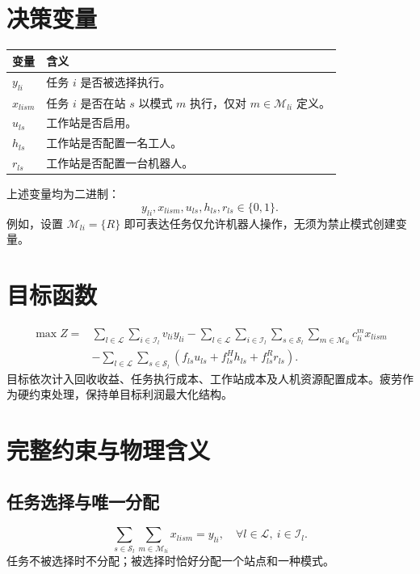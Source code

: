 \documentclass[UTF8,a4paper,11pt]{ctexart}
\begin{document}
\section{决策变量}
\begin{center}
\begin{tabularx}{\textwidth}{lX}
\toprule 变量 & 含义\\\midrule
$y_{li}$ & 任务 $i$ 是否被选择执行。\\
$x_{lism}$ & 任务 $i$ 是否在站 $s$ 以模式 $m$ 执行，仅对 $m\in\mathcal M_{li}$ 定义。\\
$u_{ls}$ & 工作站是否启用。\\
$h_{ls}$ & 工作站是否配置一名工人。\\
$r_{ls}$ & 工作站是否配置一台机器人。\\\bottomrule
\end{tabularx}
\end{center}
上述变量均为二进制：
\begin{equation}
y_{li},x_{lism},u_{ls},h_{ls},r_{ls}\in\{0,1\}.\tag{4}
\end{equation}
例如，设置 $\mathcal M_{li}=\{R\}$ 即可表达任务仅允许机器人操作，无须为禁止模式创建变量。

\section{目标函数}
\begin{equation}
\begin{aligned}
\max Z={}&\sum_{l\in\mathcal L}\sum_{i\in\mathcal I_l}v_{li}y_{li}
-\sum_{l\in\mathcal L}\sum_{i\in\mathcal I_l}\sum_{s\in\mathcal S_l}\sum_{m\in\mathcal M_{li}}c_{li}^{m}x_{lism}\\
&-\sum_{l\in\mathcal L}\sum_{s\in\mathcal S_l}
\left(f_{ls}u_{ls}+f_{ls}^{H}h_{ls}+f_{ls}^{R}r_{ls}\right).
\end{aligned}\tag{5}
\end{equation}
目标依次计入回收收益、任务执行成本、工作站成本及人机资源配置成本。疲劳作为硬约束处理，保持单目标利润最大化结构。

\section{完整约束与物理含义}
\subsection{任务选择与唯一分配}
\begin{equation}
\sum_{s\in\mathcal S_l}\sum_{m\in\mathcal M_{li}}x_{lism}=y_{li},
\quad\forall l\in\mathcal L,\ i\in\mathcal I_l.\tag{6}
\end{equation}
任务不被选择时不分配；被选择时恰好分配一个站点和一种模式。
\end{document}
